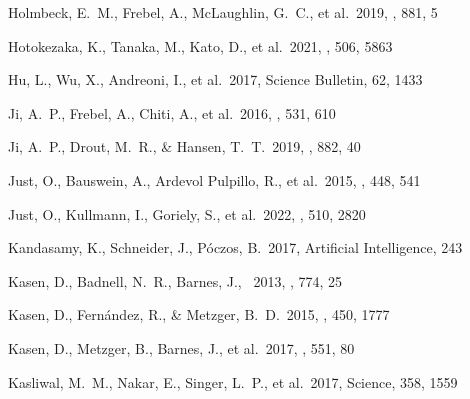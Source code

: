 \documentclass[twocolumn, twocolappendix]{aastex63}
\begin{document}
\begin{thebibliography}{}
 Holmbeck, E.~M., Frebel, A., McLaughlin, G.~C., et al.\ 2019, \apj, 881, 5


 Hotokezaka, K., Tanaka, M., Kato, D., et al.\ 2021, \mnras, 506, 5863


 Hu, L., Wu, X., Andreoni, I., et al.\ 2017, Science Bulletin, 62, 1433




 Ji, A.~P., Frebel, A., Chiti, A., et al.\ 2016, \nat, 531, 610


 Ji, A.~P., Drout, M.~R., \& Hansen, T.~T.\ 2019, \apj, 882, 40


 Just, O., Bauswein, A., Ardevol Pulpillo, R., et al.\ 2015, \mnras, 448, 541


 Just, O., Kullmann, I., Goriely, S., et al.\ 2022, \mnras, 510, 2820


 Kandasamy, K., Schneider, J., P{\'o}czos, B.\ 2017, Artificial Intelligence, 243




Kasen, D., Badnell, N.~R., Barnes, J., \ 2013, \aj, 774, 25


 Kasen, D., Fern{\'a}ndez, R., \& Metzger, B.~D.\ 2015, \mnras, 450, 1777


 Kasen, D., Metzger, B., Barnes, J., et al.\ 2017, \nat, 551, 80




 Kasliwal, M.~M., Nakar, E., Singer, L.~P., et al.\ 2017, Science, 358, 1559





\end{thebibliography}
\end{document}

